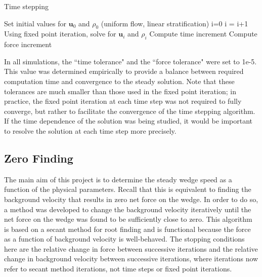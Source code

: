 \documentclass[12pt]{article}
\begin{document}
\begin{algorithm}[H]
	\caption{Time stepping}\label{timestep}
	\begin{algorithmic}[1]
		
		\State Set initial values for $\mathbf{u}_0$ and $\rho_0$ (uniform flow, linear stratification)
		\State i=0
		\State i = i+1
		\State Using fixed point iteration, solve for $\mathbf{u}_i$ and $\rho_i$
		\State Compute time increment
		\State Compute force increment
		\EndWhile
	\end{algorithmic}
\end{algorithm}

In all simulations, the ``time tolerance" and the ``force tolerance" were set to 1e-5. This value was determined empirically to provide a balance between required computation time and convergence to the steady solution. Note that these tolerances are much smaller than those used in the fixed point iteration; in practice, the fixed point iteration at each time step was not required to fully converge, but rather to facilitate the convergence of the time stepping algorithm. If the time dependence of the solution was being studied, it would be important to resolve the solution at each time step more precisely.

\subsection{Zero Finding}

The main aim of this project is to determine the steady wedge speed as a function of the physical parameters. Recall that this is equivalent to finding the background velocity that results in zero net force on the wedge. In order to do so, a method was developed to change the background velocity iteratively until the net force on the wedge was found to be sufficiently close to zero. This algorithm is based on a secant method for root finding and is functional because the force as a function of background velocity is well-behaved. The stopping conditions here are the relative change in force between successive iterations and the relative change in background velocity between successive iterations, where iterations now refer to secant method iterations, not time steps or fixed point iterations.
\end{document}
